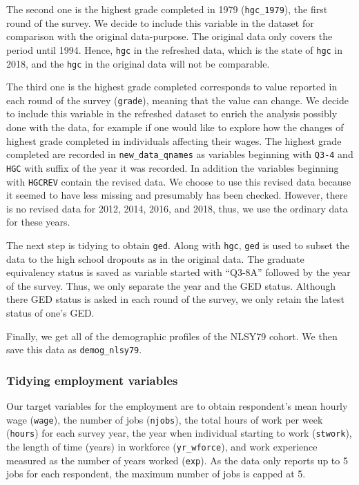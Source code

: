 \documentclass{article}
\begin{document}
The second one is the highest grade completed in 1979 (\texttt{hgc\_1979}), the first round of the survey. We decide to include this variable in the dataset for comparison with the original data-purpose. The original data only covers the period until 1994. Hence, \texttt{hgc} in the refreshed data, which is the state of \texttt{hgc} in 2018, and the \texttt{hgc} in the original data will not be comparable.

The third one is the highest grade completed corresponds to value reported in each round of the survey (\texttt{grade}), meaning that the value can change. We decide to include this variable in the refreshed dataset to enrich the analysis possibly done with the data, for example if one would like to explore how the changes of highest grade completed in individuals affecting their wages. The highest grade completed are recorded in \texttt{new\_data\_qnames} as variables beginning with \texttt{Q3-4} and \texttt{HGC} with suffix of the year it was recorded. In addition the variables beginning with \texttt{HGCREV} contain the revised data. We choose to use this revised data because it seemed to have less missing and presumably has been checked. However, there is no revised data for 2012, 2014, 2016, and 2018, thus, we use the ordinary data for these years.

The next step is tidying to obtain \texttt{ged}. Along with \texttt{hgc}, \texttt{ged} is used to subset the data to the high school dropouts as in the original data. The graduate equivalency status is saved as variable started with ``Q3-8A'' followed by the year of the survey. Thus, we only separate the year and the GED status. Although there GED status is asked in each round of the survey, we only retain the latest status of one's GED.

Finally, we get all of the demographic profiles of the NLSY79 cohort. We then save this data as \texttt{demog\_nlsy79}.

\hypertarget{tidyemp}{%
\subsubsection{Tidying employment variables}\label{tidyemp}}

Our target variables for the employment are to obtain respondent's mean hourly wage (\texttt{wage}), the number of jobs (\texttt{njobs}), the total hours of work per week (\texttt{hours}) for each survey year, the year when individual starting to work (\texttt{stwork}), the length of time (years) in workforce (\texttt{yr\_wforce}), and work experience measured as the number of years worked (\texttt{exp}). As the data only reports up to 5 jobs for each respondent, the maximum number of jobs is capped at 5.
\end{document}
